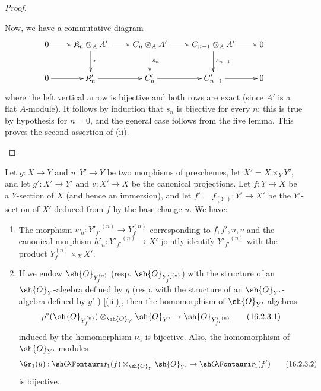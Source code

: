 \begin{proof}
\begin{enumerate}
  Now, we have a commutative diagram
  \[
    \xymatrix{
      0 \ar[r] & \mathfrak{K}_n \ar[d]^-r\ar[r] \otimes_A A' & C_n \otimes_A A' \ar[d]^-{s_n}\ar[r] & C_{n-1} \otimes_A A' \ar[d]^-{s_{n-1}}\ar[r] & 0 \\
      0 \ar[r] & \mathfrak{K}'_n \ar[r] & C'_n \ar[r] & C'_{n-1} \ar[r] & 0
    }
  \]
  where the left vertical arrow is bijective and both rows are exact (since $A'$ is a flat $A$-module).
  It follows by induction that $s_n$ is bijective for every $n$: this is true by hypothesis for $n=0$, and the general case follows from the five lemma.
  This proves the second assertion of (ii).
\end{enumerate}
\end{proof}

\begin{corollary}[16.2.3]
\label{IV.16.2.3}
Let $g:X\to Y$ and $u:Y'\to Y$ be two morphisms of preschemes, let $X'=X\times_Y Y'$, and let $g':X'\to Y'$ and $v:X'\to X$ be the canonical projections. Let $f:Y\to X$ be a $Y$-section of $X$ (and hence an immersion), and let $f'=f_{(Y')}:Y'\to X'$ be the $Y'$-section of $X'$ deduced from $f$ by the base change $u$.
We have:
\begin{enumerate}
  \item[{\rm(i)}] The morphism $w_n:{Y'_{f'}}^{(n)}\to Y_f^{(n)}$ corresponding to $f,f',u,v$  and the canonical morphism $h'_n:{Y'_{f'}}^{(n)}\to X'$ jointly identify ${Y'_{f'}}^{(n)}$ with the product $Y_f^{(n)}\times_X X'$.
  \item[{\rm(ii)}] If we endow $\sh{O}_{Y_f^{(n)}}$ (resp. $\sh{O}_{{Y'_{f'}}^{(n)}}$) with the structure of an $\sh{O}_Y$-algebra defined by $g$ (resp. with the structure of an $\sh{O}_{Y'}$-algebra defined by $g'$ ) [(iii)],
  then the homomorphism of $\sh{O}_{Y'}$-algebras
  \[
    \label{IV.16.2.3.1}
    \rho^*(\sh{O}_{Y_f^{(n)}})\otimes_{\sh{O}_Y} \sh{O}_{Y'} \to \sh{O}_{{Y'_{f'}}^{(n)}}
    \tag{16.2.3.1}
  \]
  induced by the homomorphism $\nu_n$  is bijective.
  Also, the homomorphism of $\sh{O}_{Y'}$-modules
  \[
    \label{IV.16.2.3.2}
    \Gr_1(u): \shGr_1(f)\otimes_{\sh{O}_Y} \sh{O}_{Y'} \to \shGr_1(f')
    \tag{16.2.3.2}
  \]
  is bijective.
 \end{enumerate} 
\end{corollary}

